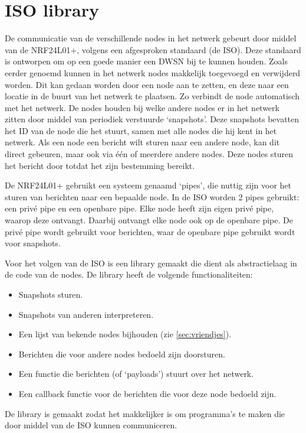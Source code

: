 \section{ISO library}

De communicatie van de verschillende nodes in het netwerk gebeurt door middel van de NRF24L01+, volgens een afgesproken standaard (de ISO). Deze standaard is ontworpen om op een goede manier een DWSN bij te kunnen houden. Zoals eerder genoemd kunnen in het netwerk nodes makkelijk toegevoegd en verwijderd worden. Dit kan gedaan worden door een node aan te zetten, en deze naar een locatie in de buurt van het netwerk te plaatsen. Zo verbindt de node automatisch met het netwerk. De nodes houden bij welke andere nodes er in het netwerk zitten door middel van periodiek verstuurde `snapshots'. Deze snapshots bevatten het ID van de node die het stuurt, samen met alle nodes die hij kent in het netwerk. Als een node een bericht wilt sturen naar een andere node, kan dit direct gebeuren, maar ook via één of meerdere andere nodes. Deze nodes sturen het bericht door totdat het zijn bestemming bereikt.

De NRF24L01+ gebruikt een systeem genaamd `pipes', die nuttig zijn voor het sturen van berichten naar een bepaalde node. In de ISO worden 2 pipes gebruikt: een privé pipe en een openbare pipe. Elke node heeft zijn eigen privé pipe, waarop deze ontvangt. Daarbij ontvangt elke node ook op de openbare pipe. De privé pipe wordt gebruikt voor berichten, waar de openbare pipe gebruikt wordt voor snapshots.

Voor het volgen van de ISO is een library gemaakt die dient als abstractielaag in de code van de nodes. De library heeft de volgende functionaliteiten:
\begin{itemize}
    \item Snapshots sturen.
    \item Snapshots van anderen interpreteren.
    \item Een lijst van bekende nodes bijhouden (zie \autoref{sec:vriendjes}).
    \item Berichten die voor andere nodes bedoeld zijn doorsturen.
    \item Een functie die berichten (of `payloads') stuurt over het netwerk.
    \item Een callback functie voor de berichten die voor deze node bedoeld zijn.
\end{itemize}
De library is gemaakt zodat het makkelijker is om programma's te maken die door middel van de ISO kunnen communiceren.


